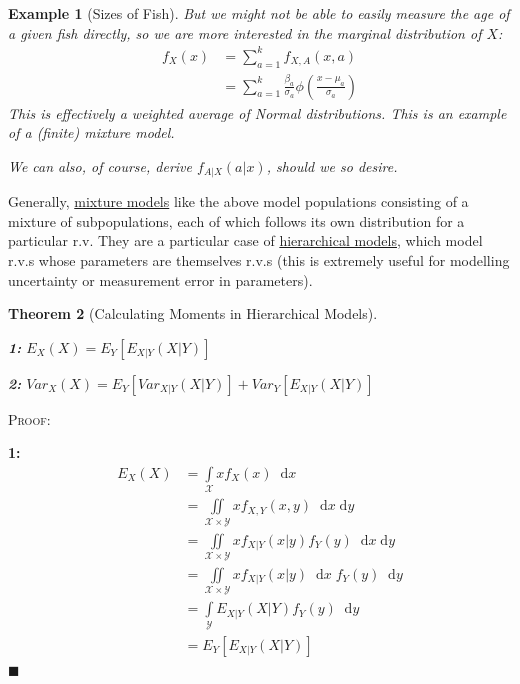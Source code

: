 \documentclass[12pt,a4paper]{article}
\newcommand{\diff}{\;\mathrm{d}}
\newtheorem{thm}{Theorem}[subsection]
\newtheorem{ex}[thm]{Example}
\begin{document}
\begin{ex}[Sizes of Fish]
But we might not be able to easily measure the age of a given fish directly, so we are more interested in the marginal distribution of $X$:
\begin{align*}
f_X(x) &= \sum_{a=1}^k f_{X,A}(x,a)\\
&= \sum_{a=1}^k \frac{\beta_a}{\sigma_a} \phi\left(\frac{x-\mu_a}{\sigma_a}\right)
\end{align*}
This is effectively a weighted average of Normal distributions. This is an example of a (finite) mixture model.

We can also, of course, derive $f_{A|X}(a|x)$, should we so desire.

\end{ex}

Generally, \underline{mixture models} like the above model populations consisting of a mixture of subpopulations, each of which follows its own distribution for a particular r.v. They are a particular case of \underline{hierarchical models}, which model r.v.s whose parameters are themselves r.v.s (this is extremely useful for modelling uncertainty or measurement error in parameters).

\begin{thm}[Calculating Moments in Hierarchical Models]\label{iterated expectation}\vspace{1cm}

\noindent\textbf{1: } $E_{X}(X) = E_{Y}[E_{{X|Y}}(X|Y)]$

\noindent\textbf{2: } $Var_{X}(X) = E_{Y}[Var_{{X|Y}}(X|Y)] + Var_{Y}[E_{{X|Y}}(X|Y)]$

\end{thm}

\noindent\textsc{Proof:}\par\vspace{1cm}

\textbf{1: }
\begin{align*}
E_{X}(X) &= \int\limits_{\mathcal{X}}\!\! xf_X(x)\;\diff x\\
&= \iint\limits_{\mathcal{X}\times\mathcal{Y}}\!\! xf_{X,Y}(x,y)\;\diff x \diff y\\
&= \iint\limits_{\mathcal{X}\times\mathcal{Y}}\!\! xf_{X|Y}(x|y) f_Y(y)\; \diff x \diff y\\
&= \iint\limits_{\mathcal{X}\times\mathcal{Y}}\!\! xf_{X|Y}(x|y)\;\diff x\; f_Y(y)\; \diff y\\
&= \int\limits_{\mathcal{Y}}\!\! E_{{X|Y}}(X|Y) f_Y(y)\; \diff y\\
&= E_{Y}[E_{X|Y}(X|Y)]
\end{align*} \hfill$\blacksquare$
\end{document}

